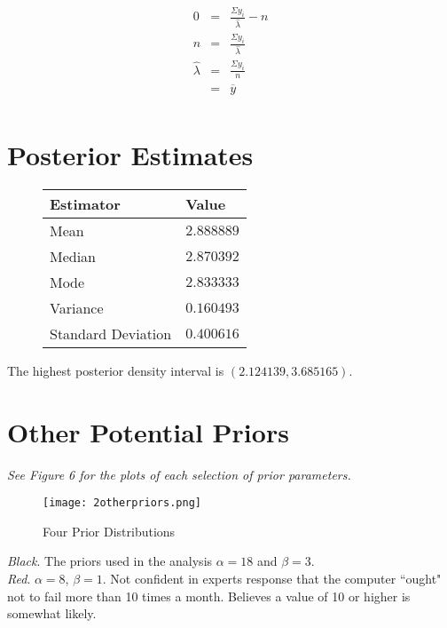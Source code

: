 \documentclass[12pt]{article}
\newcommand{\ybar}{\overline{y}}
\begin{document}
\begin{eqnarray*}
0 &=& \frac{\Sigma y_i}{\hat{\lambda}}-n \\
n &=& \frac{\Sigma y_i}{\hat{\lambda}} \\
\hat{\lambda} &=& \frac{\Sigma y_i}{n} \\
&=& \ybar \\
\end{eqnarray*}

\section*{Posterior Estimates}

\begin{figure}[H]
\begin{center}
\begin{tabular}{l|r}
Estimator & \multicolumn{1}{l}{Value} \\ \hline \hline
Mean & $2.888889$ \\
Median & $2.870392$ \\
Mode & $2.833333$ \\
Variance & $0.160493$ \\
Standard Deviation & $0.400616$ \\
\end{tabular}
\end{center}
\end{figure}

\noindent The highest posterior density interval is $(2.124139, 3.685165)$.

\section*{Other Potential Priors}

\noindent \textit{See Figure 6 for the plots of each selection of prior parameters.}
\bigskip

\begin{figure}
\begin{center}
\texttt{[image: 2otherpriors.png]}
\caption{Four Prior Distributions}
\end{center}
\end{figure}

\noindent \textit{Black}.  The priors used in the analysis $\alpha=18$ and $\beta=3$. \\ [-0.3cm]

\noindent \textit{Red}. $\alpha=8$, $\beta=1$.  Not confident in experts response that the computer ``ought" not to fail more than 10 times a month.  Believes a value of 10 or higher is somewhat likely.  \\ [-0.3cm]
\end{document}
